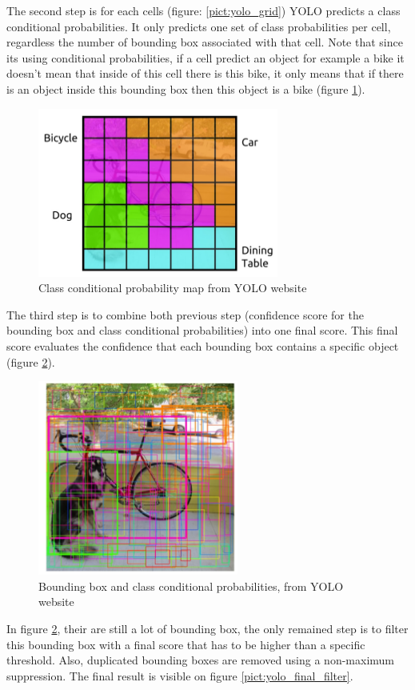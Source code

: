 The second step is for each cells (figure: \ref{pict:yolo_grid}) YOLO predicts a  class conditional probabilities. It only predicts one set of class probabilities per cell, regardless the number of bounding box associated with that cell. Note that since its using conditional probabilities, if a cell predict an object for example a bike it doesn't mean that inside of this cell there is this bike, it only means that if there is an object inside this bounding box then this object is a bike (figure \ref{pict:yolo_proba}).

\newpage

\begin{figure} [!ht]
    \centering
    \includegraphics[width=0.4\linewidth]{images/yolo_proba.png}
    \caption{ Class conditional probability map from YOLO website}
    \label{pict:yolo_proba}
\end{figure}

The third step is to combine both previous step (confidence score for the bounding box and class conditional probabilities) into one final score. This final score evaluates the confidence that each bounding box contains a specific object (figure \ref{pict:yolo_final}).

\begin{figure} [!ht]
    \centering
    \includegraphics[width=0.4\linewidth]{images/yolo_final.png}
    \caption{Bounding box and class conditional probabilities, from YOLO website}
    \label{pict:yolo_final}
\end{figure}

In figure \ref{pict:yolo_final}, their are still a lot of bounding box, the only remained step is to filter this bounding box with a final score that has to be higher than a specific threshold. Also, duplicated bounding boxes are removed using a non-maximum suppression. The final result is visible on figure \ref{pict:yolo_final_filter}.

